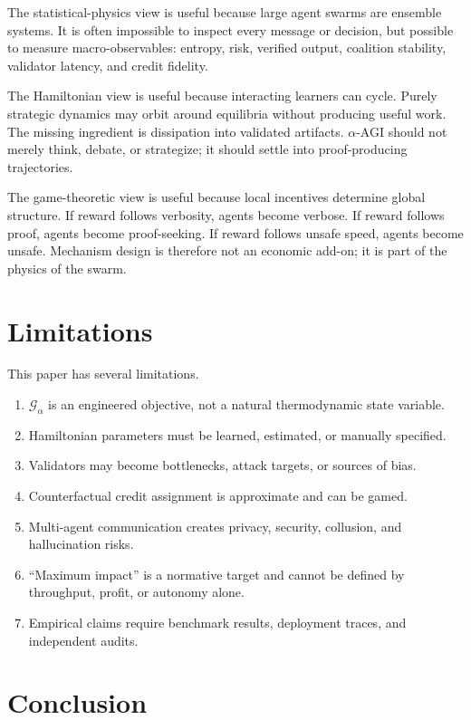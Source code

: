 \documentclass[
  11pt,
]{article}
\providecommand{\tightlist}{%
  \setlength{\itemsep}{0pt}\setlength{\parskip}{0pt}}
\begin{document}
The statistical-physics view is useful because large agent swarms are
ensemble systems. It is often impossible to inspect every message or
decision, but possible to measure macro-observables: entropy, risk,
verified output, coalition stability, validator latency, and credit
fidelity.

The Hamiltonian view is useful because interacting learners can cycle.
Purely strategic dynamics may orbit around equilibria without producing
useful work. The missing ingredient is dissipation into validated
artifacts. $\alpha$-AGI should not merely think, debate, or strategize; it
should settle into proof-producing trajectories.

The game-theoretic view is useful because local incentives determine
global structure. If reward follows verbosity, agents become verbose. If
reward follows proof, agents become proof-seeking. If reward follows
unsafe speed, agents become unsafe. Mechanism design is therefore not an
economic add-on; it is part of the physics of the swarm.

\section{Limitations}\label{limitations}

This paper has several limitations.

\begin{enumerate}
\def\labelenumi{\arabic{enumi}.}
\tightlist
\item
  \(\mathcal{G}_{\alpha}\) is an engineered objective, not a natural
  thermodynamic state variable.
\item
  Hamiltonian parameters must be learned, estimated, or manually
  specified.
\item
  Validators may become bottlenecks, attack targets, or sources of bias.
\item
  Counterfactual credit assignment is approximate and can be gamed.
\item
  Multi-agent communication creates privacy, security, collusion, and
  hallucination risks.
\item
  ``Maximum impact'' is a normative target and cannot be defined by
  throughput, profit, or autonomy alone.
\item
  Empirical claims require benchmark results, deployment traces, and
  independent audits.
\end{enumerate}

\section{Conclusion}\label{conclusion}
\end{document}
